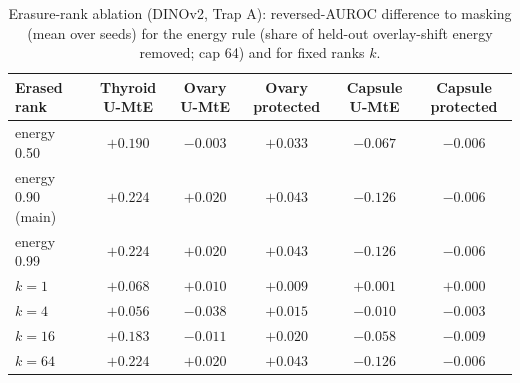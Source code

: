 \begin{table}[H]\centering\scriptsize
\caption{Erasure-rank ablation (DINOv2, Trap A): reversed-AUROC difference to masking (mean over seeds) for the energy rule (share of held-out overlay-shift energy removed; cap 64) and for fixed ranks $k$.}\label{tab:rank}
\begin{tabular}{lccccc}\toprule
Erased rank & Thyroid U-MtE & Ovary U-MtE & Ovary protected & Capsule U-MtE & Capsule protected \\\midrule
energy 0.50 & $+0.190$ & $-0.003$ & $+0.033$ & $-0.067$ & $-0.006$ \\
energy 0.90 (main) & $+0.224$ & $+0.020$ & $+0.043$ & $-0.126$ & $-0.006$ \\
energy 0.99 & $+0.224$ & $+0.020$ & $+0.043$ & $-0.126$ & $-0.006$ \\
$k=1$ & $+0.068$ & $+0.010$ & $+0.009$ & $+0.001$ & $+0.000$ \\
$k=4$ & $+0.056$ & $-0.038$ & $+0.015$ & $-0.010$ & $-0.003$ \\
$k=16$ & $+0.183$ & $-0.011$ & $+0.020$ & $-0.058$ & $-0.009$ \\
$k=64$ & $+0.224$ & $+0.020$ & $+0.043$ & $-0.126$ & $-0.006$ \\
\bottomrule\end{tabular}
\end{table}
